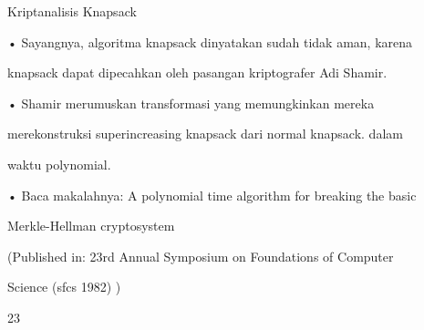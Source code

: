 \documentclass{article}
\begin{document}

Kriptanalisis Knapsack

• Sayangnya, algoritma knapsack dinyatakan sudah tidak aman, karena 

knapsack dapat dipecahkan oleh pasangan  kriptografer  Adi Shamir. 

• Shamir merumuskan transformasi yang memungkinkan mereka 

merekonstruksi superincreasing knapsack dari normal knapsack. dalam 

waktu polynomial.

• Baca makalahnya: A polynomial time algorithm for breaking the basic 

Merkle-Hellman cryptosystem 

   (Published in: 23rd Annual Symposium on Foundations of Computer 

Science  (sfcs 1982) )

23
\end{document}
